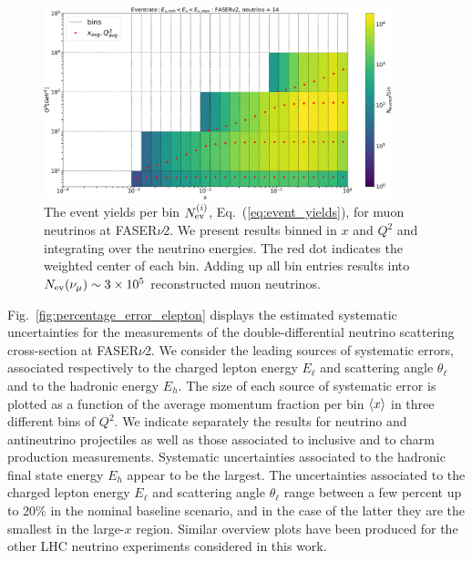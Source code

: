 \begin{figure}[!ht]
    \centering
\includegraphics[width=0.9\textwidth]{plots/Nevent_FASERv2_14.pdf}
\caption{\small The event yields per bin $ N_{\rm ev}^{(i)}$,  Eq.~(\ref{eq:event_yields}),
  for muon neutrinos at FASER$\nu$2.
  We present results binned in $x$ and $Q^2$ and integrating over the neutrino energies.
  The red dot indicates the weighted center of each bin.
  Adding up all bin entries results into $N_{\rm ev}(\nu_\mu)\sim 3\times 10^5 $ reconstructed muon
  neutrinos. }
    \label{fig:fasernu2_muon}
\end{figure}

Fig.~\ref{fig:percentage_error_elepton}
displays the estimated systematic uncertainties for the  measurements
of the double-differential
neutrino scattering cross-section at FASER$\nu$2.
%
We consider the leading sources of systematic errors,
associated respectively to the charged lepton energy $E_\ell$ and scattering angle $\theta_\ell$
and to the hadronic energy $E_h$.
%
The size of each source of systematic error is plotted as a function
of the average momentum fraction per bin $\left\langle x\right\rangle$
in three different bins of $Q^2$.
%
We indicate separately the results for neutrino and antineutrino projectiles as well as
those associated to inclusive and to charm production measurements.
%
Systematic uncertainties associated to the hadronic final state energy $E_h$ appear to be the largest.
%
The uncertainties associated to the charged lepton energy $E_\ell$ and scattering angle $\theta_\ell$ range
between a few percent up to 20\% in the nominal baseline scenario,
and in the case of the latter they are the smallest in the large-$x$ region.
%
Similar overview plots have been produced for the other LHC neutrino experiments
considered in this work.


